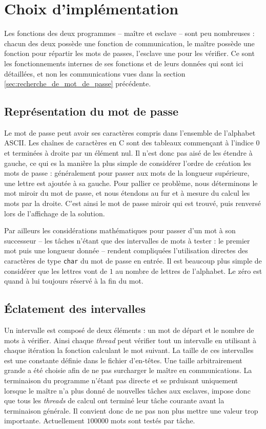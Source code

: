 \section{Choix d'implémentation} %
\label{sec:impl}

Les fonctions des deux programmes -- maître et esclave -- sont peu nombreuses : chacun des deux possède une fonction de communication, le maître possède une fonction pour répartir les mots de passes, l'esclave une pour les vérifier. Ce sont les fonctionnements internes de ses fonctions et de leurs données qui sont ici détaillées, et non les communications vues dans la section \ref{sec:recherche_de_mot_de_passe} précédente.

\subsection{Représentation du mot de passe}

Le mot de passe peut avoir ses caractères compris dans l'ensemble de l'alphabet \textsf{ASCII}. Les chaînes de caractères en \textsf{C} sont des tableaux commençant à l'indice $0$ et terminées à droite par un élément nul. Il n'est donc pas aisé de les étendre à gauche, ce qui es la manière la plus simple de considérer l'ordre de création les mots de passe : généralement pour passer aux mots de la longueur supérieure, une lettre est ajoutée à sa gauche. Pour pallier ce problème, nous déterminons le mot miroir du mot de passe, et nous étendons au fur et à mesure du calcul les mots par la droite. C'est ainsi le mot de passe miroir qui est trouvé, puis renversé lors de l'affichage de la solution.

Par ailleurs les considérations mathématiques pour passer d'un mot à son successeur -- les tâches n'étant que des intervalles de mots à tester : le premier mot puis une longueur donnée -- rendent compliquées l'utilisation directes des caractères de type \texttt{char} du mot de passe en entrée. Il est beaucoup plus simple de considérer que les lettres vont de $1$ au nombre de lettres de l'alphabet. Le zéro est quand à lui toujours réservé à la fin du mot.


\subsection{\'Eclatement des intervalles}

Un intervalle est composé de deux éléments : un mot de départ et le nombre de mots à vérifier. Ainsi chaque \emph{thread} peut vérifier tout un intervalle en utilisant à chaque itération la fonction calculant le mot suivant. La taille de ces intervalles est une constante définie dans le fichier d'en-têtes. Une taille arbitrairement grande a été choisie afin de ne pas surcharger le maître en communications. La terminaison du programme n'étant pas directe et se prduisant uniquement lorsque le maître n'a plus donné de nouvelles tâches aux esclaves, impose donc que tous les \emph{threads} de calcul ont terminé leur tâche courante avant la terminaison générale. Il convient donc de ne pas non plus mettre une valeur trop importante. Actuellement $100000$ mots sont testés par tâche.

